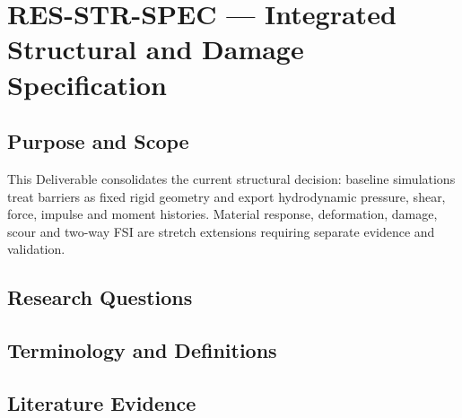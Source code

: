 
\section{RES-STR-SPEC --- Integrated Structural and Damage Specification}
\label{sec:res-str-spec}

\subsection{Purpose and Scope}
\label{sec:res-str-spec-purpose}

This Deliverable consolidates the current structural decision:
baseline simulations treat barriers as fixed rigid geometry and export
hydrodynamic pressure, shear, force, impulse and moment histories.
Material response, deformation, damage, scour and two-way FSI are
stretch extensions requiring separate evidence and validation.

\subsection{Research Questions}
\label{sec:res-str-spec-research-questions}


\subsection{Terminology and Definitions}
\label{sec:res-str-spec-definitions}


\subsection{Literature Evidence}
\label{sec:res-str-spec-literature-evidence}

